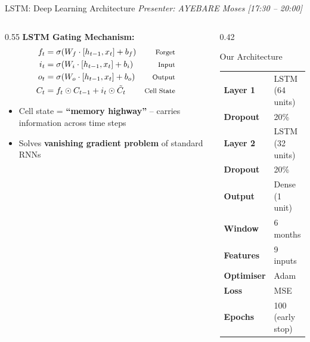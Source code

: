 \documentclass[aspectratio=169,11pt]{beamer}
\begin{document}
\begin{frame}{LSTM: Deep Learning Architecture}
\textit{\small Presenter: AYEBARE Moses \hfill [17:30 -- 20:00]}
\begin{columns}
\begin{column}{0.55\textwidth}
\textbf{LSTM Gating Mechanism:}
\begin{align*}
f_t &= \sigma(W_f \cdot [h_{t-1}, x_t] + b_f) & \text{\footnotesize Forget}\\
i_t &= \sigma(W_i \cdot [h_{t-1}, x_t] + b_i) & \text{\footnotesize Input}\\
o_t &= \sigma(W_o \cdot [h_{t-1}, x_t] + b_o) & \text{\footnotesize Output}\\
C_t &= f_t \odot C_{t-1} + i_t \odot \tilde{C}_t & \text{\footnotesize Cell State}
\end{align*}
\vspace{-0.3em}
\begin{itemize}
    \item Cell state = \textbf{``memory highway''} -- carries information across time steps
    \item Solves \textbf{vanishing gradient problem} of standard RNNs
\end{itemize}
\end{column}
\begin{column}{0.42\textwidth}
\begin{block}{\small Our Architecture}
\footnotesize
\begin{tabular}{ll}
\textbf{Layer 1} & LSTM (64 units) \\
\textbf{Dropout} & 20\% \\
\textbf{Layer 2} & LSTM (32 units) \\
\textbf{Dropout} & 20\% \\
\textbf{Output} & Dense (1 unit) \\
\midrule
\textbf{Window} & 6 months \\
\textbf{Features} & 9 inputs \\
\textbf{Optimiser} & Adam \\
\textbf{Loss} & MSE \\
\textbf{Epochs} & 100 (early stop) \\
\end{tabular}
\end{block}
\end{column}
\end{columns}
\end{frame}
\end{document}
